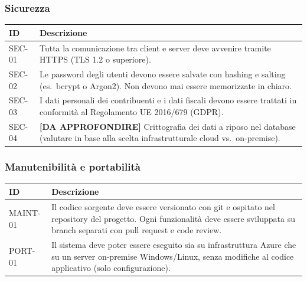 \documentclass[12pt, a4paper]{article}
\begin{document}
\subsubsection{Sicurezza}

\begin{longtable}{@{}p{2.5cm}p{9.5cm}@{}}
  \toprule
  \textbf{ID} & \textbf{Descrizione} \\
  \midrule
  \endhead

  SEC-01 &
  Tutta la comunicazione tra client e server deve avvenire tramite HTTPS (TLS 1.2 o
  superiore). \\[6pt]

  SEC-02 &
  Le password degli utenti devono essere salvate con hashing e salting (es.\ bcrypt o
  Argon2). Non devono mai essere memorizzate in chiaro. \\[6pt]

  SEC-03 &
  I dati personali dei contribuenti e i dati fiscali devono essere trattati in conformità
  al Regolamento UE 2016/679 (GDPR). \\[6pt]

  SEC-04 &
  \textbf{[DA APPROFONDIRE]} Crittografia dei dati a riposo nel database (valutare in
  base alla scelta infrastrutturale cloud vs.\ on-premise). \\

  \bottomrule
\end{longtable}

\subsubsection{Manutenibilità e portabilità}

\begin{longtable}{@{}p{2.5cm}p{9.5cm}@{}}
  \toprule
  \textbf{ID} & \textbf{Descrizione} \\
  \midrule
  \endhead

  MAINT-01 &
  Il codice sorgente deve essere versionato con git e ospitato nel repository del progetto.
  Ogni funzionalità deve essere sviluppata su branch separati con pull request e code review. \\[6pt]

  PORT-01 &
  Il sistema deve poter essere eseguito sia su infrastruttura Azure che su un server
  on-premise Windows/Linux, senza modifiche al codice applicativo (solo configurazione). \\

  \bottomrule
\end{longtable}
\end{document}
